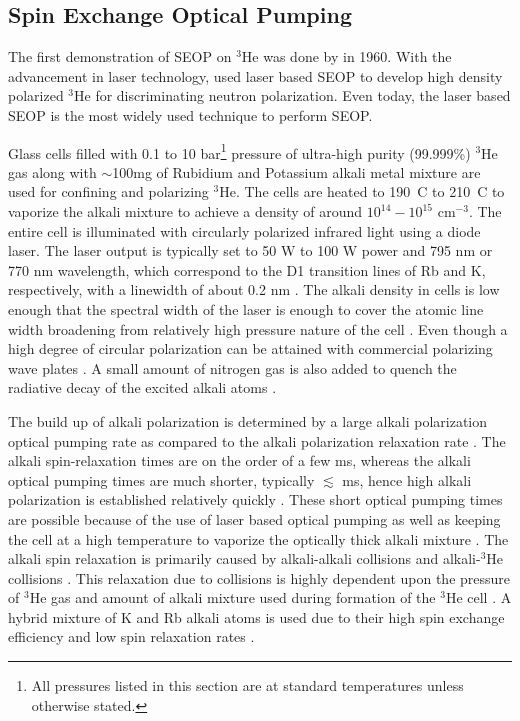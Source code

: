 \subsection{Spin Exchange Optical Pumping}


The first demonstration of SEOP on $^3$He was done by \cite{Bouchiat1960} in 1960. With the advancement in laser technology, \cite{Chupp1987} used laser based SEOP to develop high density polarized $^3$He for discriminating neutron polarization. Even today, the laser based SEOP is the most widely used technique to perform SEOP.

Glass cells filled with 0.1 to 10 bar\footnote{All pressures listed in this section are at standard temperatures unless otherwise stated.} pressure of ultra-high purity (99.999\%) $^3$He gas along with $\sim$100mg of Rubidium and Potassium alkali metal mixture are used for confining and polarizing $^3$He. The cells are heated to 190~\degree C to 210~\degree C to vaporize the alkali mixture to achieve a density of around $10^{14}-10^{15}$ cm$^{-3}$. The entire cell is illuminated with circularly polarized infrared light using a diode laser. The laser output is typically set to 50 W to 100 W power and 795 nm or 770 nm wavelength, which correspond to the D1 transition lines of Rb and K, respectively, with a linewidth of about 0.2 nm \cite{Gentile2017, Ben-AmarBaranga1998, Chen2014}. The alkali density in cells is low enough that the spectral width of the laser is enough to cover the atomic line width broadening from relatively high pressure nature of the cell \cite{Romalis1997, Kluttz2013}. Even though a high degree of circular polarization can be attained with commercial polarizing wave plates \cite{Bhaskar1979, Chann2002}. A small amount of nitrogen gas is also added to quench the radiative decay of the excited alkali atoms \cite{Walker1997, Lancor2010}.

The build up of alkali polarization is determined by a large alkali polarization optical pumping rate as compared to the alkali polarization relaxation rate \cite{Gentile2017}. The alkali spin-relaxation times are on the order of a few ms, whereas the alkali optical pumping times are much shorter, typically $\lesssim$ ms, hence high alkali polarization is established relatively quickly \cite{Chen2011}. These short optical pumping times are possible because of the use of laser based optical pumping as well as keeping the cell at a high temperature to vaporize the optically thick alkali mixture \cite{Gentile2017, Chen2011, Babcock2016}. The alkali spin relaxation is primarily caused by alkali-alkali collisions and alkali-$^3$He collisions \cite{Ben-AmarBaranga1998}. This relaxation due to collisions is highly dependent upon the pressure of $^3$He gas and amount of alkali mixture used during formation of the $^3$He cell \cite{Ben-AmarBaranga1998}. A hybrid mixture of K and Rb alkali atoms is used due to their high spin exchange efficiency and low spin relaxation rates \cite{Babcock2003, Chen2007}.

